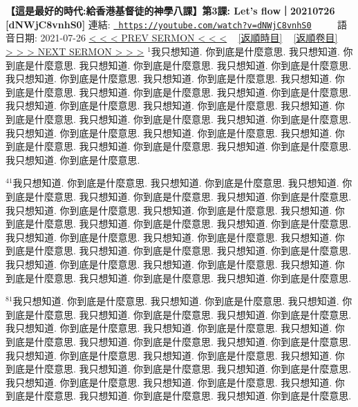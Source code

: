 \documentclass{book}
\begin{document}
\section{}
\label{sec:dNWjC8vnhS0}
\textbf{【這是最好的時代:給香港基督徒的神學八課】第3課: Let’s flow｜20210726 [dNWjC8vnhS0]}
\newline
\newline
連結: \href{https://youtube.com/watch?v=dNWjC8vnhS0}{\texttt{ https://youtube.com/watch?v=dNWjC8vnhS0}} ~~~~ 語音日期: 2021-07-26 
\newline
\newline
\hyperref[sec:Gv9ZCQJGqmE]{\small{< < < PREV SERMON < < <}}
~
\hyperref[sec:index_chronic]{\small{[返順時目]}}
~
\hyperref[sec:index_scriptual]{\small{[返順卷目]}}
~
\hyperref[sec:Gprv_Nw0Oi4]{\small{> > > NEXT SERMON > > >}}
\newline
\newline
$^{1}$我只想知道.
你到底是什麼意思.
我只想知道.
你到底是什麼意思.
我只想知道.
你到底是什麼意思.
我只想知道.
你到底是什麼意思.
我只想知道.
你到底是什麼意思.
我只想知道.
你到底是什麼意思.
我只想知道.
你到底是什麼意思.
我只想知道.
你到底是什麼意思.
我只想知道.
你到底是什麼意思.
我只想知道.
你到底是什麼意思.
我只想知道.
你到底是什麼意思.
我只想知道.
你到底是什麼意思.
我只想知道.
你到底是什麼意思.
我只想知道.
你到底是什麼意思.
我只想知道.
你到底是什麼意思.
我只想知道.
你到底是什麼意思.
我只想知道.
你到底是什麼意思.
我只想知道.
你到底是什麼意思.
我只想知道.
你到底是什麼意思.
我只想知道.
你到底是什麼意思.

$^{41}$我只想知道.
你到底是什麼意思.
我只想知道.
你到底是什麼意思.
我只想知道.
你到底是什麼意思.
我只想知道.
你到底是什麼意思.
我只想知道.
你到底是什麼意思.
我只想知道.
你到底是什麼意思.
我只想知道.
你到底是什麼意思.
我只想知道.
你到底是什麼意思.
我只想知道.
你到底是什麼意思.
我只想知道.
你到底是什麼意思.
我只想知道.
你到底是什麼意思.
我只想知道.
你到底是什麼意思.
我只想知道.
你到底是什麼意思.
我只想知道.
你到底是什麼意思.
我只想知道.
你到底是什麼意思.
我只想知道.
你到底是什麼意思.
我只想知道.
你到底是什麼意思.
我只想知道.
你到底是什麼意思.
我只想知道.
你到底是什麼意思.
我只想知道.
你到底是什麼意思.

$^{81}$我只想知道.
你到底是什麼意思.
我只想知道.
你到底是什麼意思.
我只想知道.
你到底是什麼意思.
我只想知道.
你到底是什麼意思.
我只想知道.
你到底是什麼意思.
我只想知道.
你到底是什麼意思.
我只想知道.
你到底是什麼意思.
我只想知道.
你到底是什麼意思.
我只想知道.
你到底是什麼意思.
我只想知道.
你到底是什麼意思.
我只想知道.
你到底是什麼意思.
我只想知道.
你到底是什麼意思.
我只想知道.
你到底是什麼意思.
我只想知道.
你到底是什麼意思.
我只想知道.
你到底是什麼意思.
我只想知道.
你到底是什麼意思.
我只想知道.
你到底是什麼意思.
我只想知道.
你到底是什麼意思.
我只想知道.
你到底是什麼意思.
我只想知道.
你到底是什麼意思.
\end{document}
